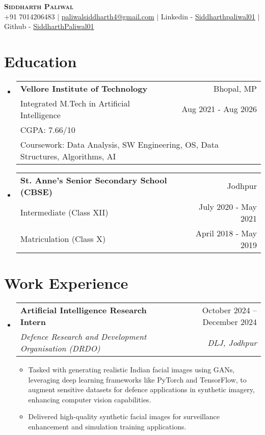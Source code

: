\documentclass[letterpaper,11pt]{article}
\makeatletter
\newcommand{\resumeItem}[1]{
  \item\small{
    {#1 \vspace{-2pt}}
  }
}
\newcommand{\resumeSubheading}[4]{
  \vspace{-2pt}\item
    \begin{tabular*}{0.97\textwidth}[t]{l@{\extracolsep{\fill}}r}
      \textbf{#1} & #2 \\
      \textit{\small#3} & \textit{\small #4} \\
    \end{tabular*}\vspace{-7pt}
}
\newcommand{\educationEntry}[6]{
  \vspace{-2pt}\item
    \begin{tabular*}{0.97\textwidth}[t]{l@{\extracolsep{\fill}}r}
      \textbf{#1} & \small{#2} \\
      \small{#3} & \small{#4} \\
      \small{#5} & \small{#6} \\
    \end{tabular*}\vspace{-7pt}
}
\newcommand{\educationEntryWithCoursework}[7]{
  \vspace{-2pt}\item
    \begin{tabular*}{0.97\textwidth}[t]{l@{\extracolsep{\fill}}r}
      \textbf{#1} & \small{#2} \\
      \small{#3} & \small{#4} \\
      \small{#5} & \\
      \multicolumn{2}{l}{\small{#7}} \\
    \end{tabular*}\vspace{-7pt}
}
\newcommand{\resumeSubHeadingListStart}{\begin{itemize}[leftmargin=0.15in, label={}]}
\newcommand{\resumeSubHeadingListEnd}{\end{itemize}}
\newcommand{\resumeItemListStart}{\begin{itemize}}
\newcommand{\resumeItemListEnd}{\end{itemize}\vspace{-5pt}}
\makeatother
\begin{document}
\begin{center}
    \textbf{\Huge \scshape Siddharth Paliwal} \\ \vspace{1pt}
    \small +91 7014206483 $|$ \href{mailto:paliwalsiddharth4@gmail.com}{{paliwalsiddharth4@gmail.com}} $|$ 
    {\color{black}Linkedin} - \href{https://www.linkedin.com/in/siddharthpaliwal01/}{{Siddharthpaliwal01}} $|$
    {\color{black}Github} - \href{https://github.com/SiddharthPaliwal01}{{SiddharthPaliwal01}}
\end{center}

\section{Education}
  \resumeSubHeadingListStart
    \educationEntryWithCoursework
      {Vellore Institute of Technology}
      {Bhopal, MP}
      {Integrated M.Tech in Artificial Intelligence}
      {Aug 2021 - Aug 2026}
      {CGPA: 7.66/10}
      {}
      {Coursework: Data Analysis, SW Engineering, OS, Data Structures, Algorithms, AI}
      
    \educationEntry
      {St. Anne's Senior Secondary School (CBSE)}
      {Jodhpur}
      {Intermediate (Class XII)}
      {July 2020 - May 2021}
      {Matriculation (Class X)}
      {April 2018 - May 2019}
  \resumeSubHeadingListEnd

\section{Work Experience}
  \resumeSubHeadingListStart
    \resumeSubheading
      {Artificial Intelligence Research Intern}{October 2024 -- December 2024}
      {Defence Research and Development Organisation (DRDO)}{DLJ, Jodhpur}
      \resumeItemListStart
        \resumeItem{Tasked with generating realistic Indian facial images using GANs, leveraging deep learning frameworks like PyTorch and TensorFlow, to augment sensitive datasets for defence applications in synthetic imagery, enhancing computer vision capabilities.}
        \resumeItem{Delivered high-quality synthetic facial images for surveillance enhancement and simulation training applications.}
      \resumeItemListEnd
  \resumeSubHeadingListEnd

\end{document}
